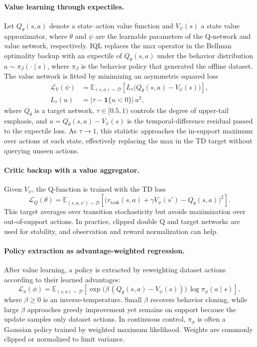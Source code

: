\documentclass[master,english,final]{kaist-ucs}
\begin{document}
\paragraph{Value learning through expectiles.}
Let $Q_\theta(s,a)$ denote a state--action value function and $V_\psi(s)$ a state value approximator, where $\theta$ and $\psi$ are the learnable parameters of the Q-network and value network, respectively. IQL replaces the max operator in the Bellman optimality backup with an expectile of $Q_\theta(s,a)$ under the behavior distribution $a \sim \pi_\beta(\cdot\mid s)$, where $\pi_\beta$ is the behavior policy that generated the offline dataset. The value network is fitted by minimizing an asymmetric squared loss
\begin{align}
\mathcal{L}_V(\psi)
&=\mathbb{E}_{(s,a)\sim\mathcal{D}}
\!\left[L_\tau\!\big(Q_{\bar\theta}(s,a)-V_\psi(s)\big)\right], \\
L_\tau(u)&=\big|\tau-\mathbf{1}\{u<0\}\big|\,u^2,
\end{align}
where $Q_{\bar\theta}$ is a target network, $\tau\in[0.5,1)$ controls the degree of upper-tail emphasis, and $u = Q_{\bar\theta}(s,a)-V_\psi(s)$ is the temporal-difference residual passed to the expectile loss. As $\tau\to 1$, this statistic approaches the in-support maximum over actions at each state, effectively replacing the max in the TD target without querying unseen actions.

\paragraph{Critic backup with a value aggregator.}
Given $V_\psi$, the Q-function is trained with the TD loss
\begin{equation}
\mathcal{L}_Q(\theta)=
\mathbb{E}_{(s,a,s')\sim\mathcal{D}}
\left[
\big(r_{\text{task}}(s,a)+\gamma V_\psi(s')-Q_\theta(s,a)\big)^2
\right].
\end{equation}
This target averages over transition stochasticity but avoids maximization over out-of-support actions.
In practice, clipped double Q and target networks are used for stability, and observation and reward normalization can help.

\paragraph{Policy extraction as advantage-weighted regression.}
After value learning, a policy is extracted by reweighting dataset actions according to their learned advantages:
\begin{equation}
\mathcal{L}_\pi(\phi)=
\mathbb{E}_{(s,a)\sim\mathcal{D}}
\left[
\exp\!\big(\beta\,(Q_{\bar\theta}(s,a)-V_\psi(s))\big)\,
\log \pi_\phi(a\mid s)
\right],
\end{equation}
where $\beta\ge 0$ is an inverse-temperature.
Small $\beta$ recovers behavior cloning, while large $\beta$ approaches greedy improvement yet remains on support because the update samples only dataset actions.
In continuous control, $\pi_\phi$ is often a Gaussian policy trained by weighted maximum likelihood.
Weights are commonly clipped or normalized to limit variance.
\end{document}
